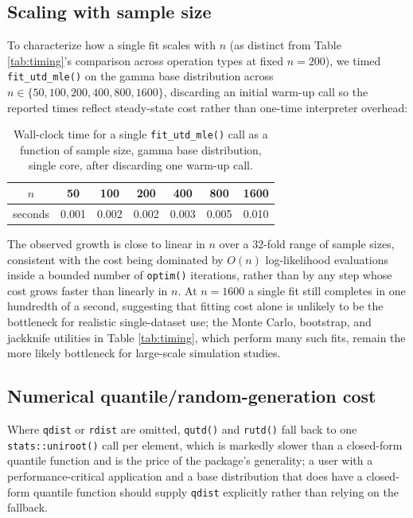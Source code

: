 \subsection{Scaling with sample size}

To characterize how a single fit scales with $n$ (as distinct from
Table \ref{tab:timing}'s comparison across operation types at fixed
$n=200$), we timed \texttt{fit\_utd\_mle()} on the gamma base
distribution across $n \in \{50,100,200,400,800,1600\}$, discarding an
initial warm-up call so the reported times reflect steady-state cost
rather than one-time interpreter overhead:

\begin{table}[htbp]
\centering
\begin{tabular}{@{}ccccccc@{}}
\toprule
$n$ & 50 & 100 & 200 & 400 & 800 & 1600 \\
\midrule
seconds & 0.001 & 0.002 & 0.002 & 0.003 & 0.005 & 0.010 \\
\bottomrule
\end{tabular}
\caption{Wall-clock time for a single \texttt{fit\_utd\_mle()} call as a
function of sample size, gamma base distribution, single core, after
discarding one warm-up call.}
\label{tab:scaling}
\end{table}

The observed growth is close to linear in $n$ over a 32-fold range of
sample sizes, consistent with the cost being dominated by
$O(n)$ log-likelihood evaluations inside a bounded number of
\texttt{optim()} iterations, rather than by any step whose cost grows
faster than linearly in $n$. At $n=1600$ a single fit still completes
in one hundredth of a second, suggesting that fitting cost alone is
unlikely to be the bottleneck for realistic single-dataset use; the
Monte Carlo, bootstrap, and jackknife utilities in Table
\ref{tab:timing}, which perform many such fits, remain the more likely
bottleneck for large-scale simulation studies.

\subsection{Numerical quantile/random-generation cost}

Where \texttt{qdist} or \texttt{rdist} are omitted, \texttt{qutd()} and
\texttt{rutd()} fall back to one \texttt{stats::uniroot()} call per
element, which is markedly slower than a closed-form quantile function
and is the price of the package's generality; a user with a
performance-critical application and a base distribution that does have
a closed-form quantile function should supply \texttt{qdist} explicitly
rather than relying on the fallback.

